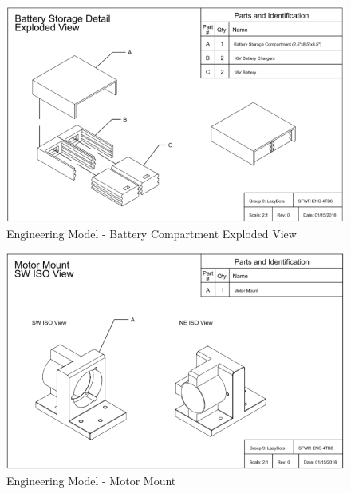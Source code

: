 \documentclass [10pt]{article}
\begin{document}
\begin{figure}
	\centering
	\includegraphics [scale = 0.55] {figures/CAD_Battery.png}
	\caption{Engineering Model - Battery Compartment Exploded View}
\end{figure}

\begin{figure}
	\centering
	\includegraphics [scale = 0.55] {figures/CAD_Motor_Mount.png}
	\caption{Engineering Model - Motor Mount}
\end{figure}
\end{document}
